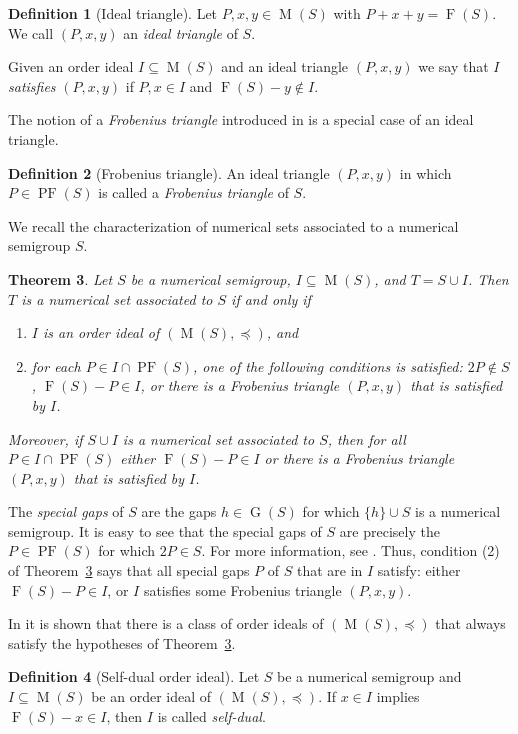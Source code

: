 \documentclass{amsproc}
\DeclareMathOperator{\F}{F}
\DeclareMathOperator{\G}{G}
\DeclareMathOperator{\PF}{PF}
\DeclareMathOperator{\M}{M}
\newtheorem{theorem}{Theorem}[section]
\theoremstyle{definition}
\newtheorem{definition}[theorem]{Definition}
\theoremstyle{remark}
\numberwithin{equation}{section}
\begin{document}
\begin{definition}[Ideal triangle]
Let $P,x,y \in \M(S)$ with $P+x+y = \F(S)$. We call $(P,x,y)$ an \emph{ideal triangle} of $S$.

Given an order ideal $I \subseteq \M(S)$ and an ideal triangle $(P,x,y)$ we say that $I$ \emph{satisfies} $(P,x,y)$ if $P, x\in I$ and $\F(S)-y\notin I$.
\end{definition}

The notion of a \emph{Frobenius triangle} introduced in \cite[Definition 3.1]{chen2023enumeratingnumericalsetsassociated} is a special case of an ideal triangle. 

\begin{definition}[Frobenius triangle]
An ideal triangle $(P,x,y)$ in which $P\in \PF(S)$ is called a \emph{Frobenius triangle} of $S$.
\end{definition}

We recall the characterization of numerical sets associated to a numerical semigroup $S$.
\begin{theorem}\cite[Theorem 3.9]{chen2023enumeratingnumericalsetsassociated}\label{thm:classify_num_set}
Let $S$ be a numerical semigroup, $I \subseteq \M(S)$, and $T = S \cup I$.  Then $T$ is a numerical set associated to $S$ if and only if 
\begin{enumerate}[leftmargin=*]
\item $I$ is an order ideal of $(\M(S),\preccurlyeq)$, and
\item for each $P \in I \cap \PF(S)$, one of the following conditions is satisfied: $2P\not\in S$, $\F(S) - P \in I$, or there is a Frobenius triangle $(P,x,y)$ that is satisfied by $I$.
\end{enumerate}
Moreover, if $S \cup I$ is a numerical set associated to $S$, then for all $P \in I \cap \PF(S)$ either $\F(S)-P \in I$ or there is a Frobenius triangle $(P,x,y)$ that is satisfied by $I$.
\end{theorem}

The \emph{special gaps} of $S$ are the gaps $h\in \G(S)$ for which $\{h\}\cup S$ is a numerical semigroup.  It is easy to see that the special gaps of $S$ are precisely the $P\in\PF(S)$ for which $2P\in S$. For more information, see \cite[Chapter 3]{rosales_numerical_2009}. Thus, condition (2) of Theorem~\ref{thm:classify_num_set} says that all special gaps $P$ of $S$ that are in $I$ satisfy: either $\F(S)-P\in I$, or $I$ satisfies some Frobenius triangle $(P,x,y)$.


In \cite{chen2023enumeratingnumericalsetsassociated} it is shown that there is a class of order ideals of $(\M(S),\preccurlyeq)$ that always satisfy the hypotheses of Theorem~\ref{thm:classify_num_set}.
\begin{definition}[Self-dual order ideal]
    Let $S$ be a numerical semigroup and $I\subseteq \M(S)$ be an order ideal of $(\M(S),\preccurlyeq)$. If $x \in I$ implies $\F(S) -x \in I$, then $I$ is called \emph{self-dual}.
\end{definition}
\end{document}
